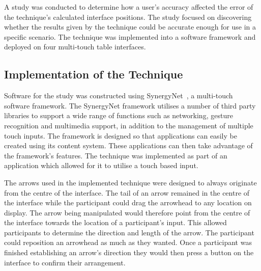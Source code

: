 \documentclass{bmcart}
\begin{document}
A study was conducted to determine how a user's accuracy affected the error of the technique's calculated interface positions.
The study focused on discovering whether the results given by the technique could be accurate enough for use in a specific scenario.
The technique was implemented into a software framework and deployed on four multi-touch table interfaces.

\subsection*{Implementation of the Technique}\label{sec:implementation}


Software for the study was constructed using SynergyNet~\cite{AlAgha2010}, a multi-touch software framework.
The SynergyNet framework utilises a number of third party libraries to support a wide range of functions such as networking, gesture recognition and multimedia support, in addition to the management of multiple touch inputs.
The framework is designed so that applications can easily be created using its content system.
These applications can then take advantage of the framework's features.
The technique was implemented as part of an application which allowed for it to utilise a touch based input.

The arrows used in the implemented technique were designed to always originate from the centre of the interface.
The tail of an arrow remained in the centre of the interface while the participant could drag the arrowhead to any location on display.
The arrow being manipulated would therefore point from the centre of the interface towards the location of a participant's input.
This allowed participants to determine the direction and length of the arrow.
The participant could reposition an arrowhead as much as they wanted.
Once a participant was finished establishing an arrow's direction they would then press a button on the interface to confirm their arrangement.
\end{document}
